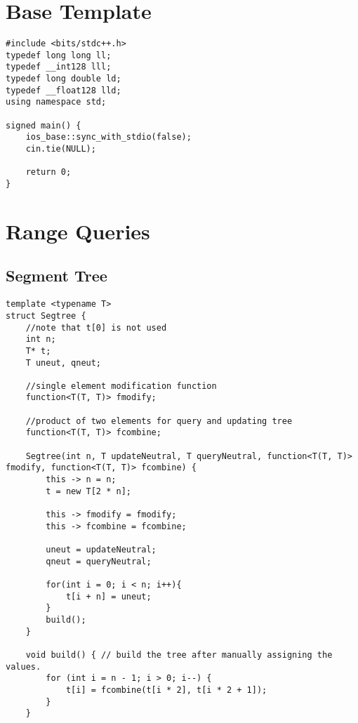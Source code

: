 \documentclass[8pt, headheight=10pt]{scrartcl}
\title{\scalebox{2}{\fontsize{32pt}{0pt}\selectfont \textbf{Goon}}}
\author{\scalebox{1}{\fontsize{16pt}{0pt}\selectfont {Andwerp, dmot, Duckling}}}
\affil{\scalebox{1}{\fontsize{12pt}{0pt}\selectfont {Texas A\&M University}}}
\begin{document}
\begin{titlingpage}
\maketitle
\end{titlingpage}
\pagebreak

\begin{multicols*}{3}
\section{Base Template}
\begin{lstlisting}
#include <bits/stdc++.h>
typedef long long ll;
typedef __int128 lll;
typedef long double ld;
typedef __float128 lld;
using namespace std;

signed main() {
    ios_base::sync_with_stdio(false);
    cin.tie(NULL);
    
    return 0;
}
\end{lstlisting}

\section{Range Queries}
\subsection{Segment Tree}
\begin{lstlisting}
template <typename T>
struct Segtree {
    //note that t[0] is not used
    int n;
    T* t;
    T uneut, qneut;

    //single element modification function
    function<T(T, T)> fmodify;

    //product of two elements for query and updating tree
    function<T(T, T)> fcombine;

    Segtree(int n, T updateNeutral, T queryNeutral, function<T(T, T)> fmodify, function<T(T, T)> fcombine) {
        this -> n = n;
        t = new T[2 * n];

        this -> fmodify = fmodify;
        this -> fcombine = fcombine;

        uneut = updateNeutral;
        qneut = queryNeutral;

        for(int i = 0; i < n; i++){
            t[i + n] = uneut;
        }
        build();
    }

    void build() { // build the tree after manually assigning the values.
        for (int i = n - 1; i > 0; i--) {   
            t[i] = fcombine(t[i * 2], t[i * 2 + 1]);
        }
    }


\end{lstlisting}
\end{multicols*}
\end{document}
